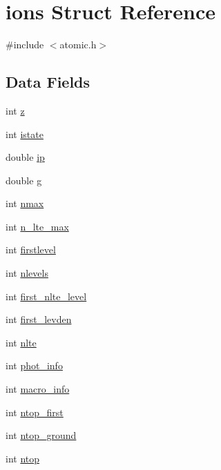 \hypertarget{structions}{}\section{ions Struct Reference}
\label{structions}


{\ttfamily \#include $<$atomic.\+h$>$}

\subsection*{Data Fields}
\begin{DoxyCompactItemize}
\item 
int \hyperlink{structions_a7921d204910e66ef597652fd718a6e30}{z}
\item 
int \hyperlink{structions_a6c53ccb844643958ab083272b4378be3}{istate}
\item 
double \hyperlink{structions_afa8f00012fd4fa84dc26b9c74059aee9}{ip}
\item 
double \hyperlink{structions_a57bcd07f6852176e85629314a1e8a057}{g}
\item 
int \hyperlink{structions_ae19d58cf3058c3b595159e14a5b6ecc3}{nmax}
\item 
int \hyperlink{structions_ad1a3502b3bb9e66a5f6c26271b2d4785}{n\+\_\+lte\+\_\+max}
\item 
int \hyperlink{structions_a587f7b3375cf15bf273583f42be7816b}{firstlevel}
\item 
int \hyperlink{structions_ae5bd51a01c8a5b1b68f89a3b3b545510}{nlevels}
\item 
int \hyperlink{structions_a83472c99234de6ca9d530d69b71e3d04}{first\+\_\+nlte\+\_\+level}
\item 
int \hyperlink{structions_ae85a5d5e56e8f31e011e3a03baa2ef32}{first\+\_\+levden}
\item 
int \hyperlink{structions_ad10a7e7016ca466bb48a388847845b8e}{nlte}
\item 
int \hyperlink{structions_ab41b47c0eb38c886ea1ba28b864f6e5c}{phot\+\_\+info}
\item 
int \hyperlink{structions_a298717adc28d36241709fa5d1ecabed3}{macro\+\_\+info}
\item 
int \hyperlink{structions_adb21dc2f3509a844567181c918719eaa}{ntop\+\_\+first}
\item 
int \hyperlink{structions_a7a20d53750d8e98067c466d385ff6c49}{ntop\+\_\+ground}
\item 
int \hyperlink{structions_ae8e97395b91ddca6262ef7246b514b73}{ntop}
\item 

\end{DoxyCompactItemize}
